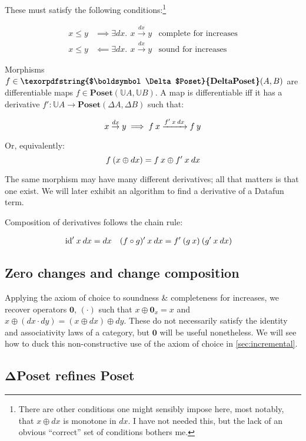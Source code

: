 \documentclass{rntz}\usepackage[a5]{rntzgeometry}\usepackage[fullwidth=130mm,width=330pt,]{narrow}
\newcommand\mathvar[1]{\ensuremath{#1}} %
\newcommand\cat\textbf
\newcommand\CP{\cat{\texorpdfstring{$\boldsymbol\Delta$Poset}{DeltaPoset}}}
\newcommand\Poset{\cat{Poset}}
\newcommand\D\Delta
\newcommand\zero{\ensuremath{\mathbold{0}}}
\newcommand\<{\mskip 4mu plus 4mu minus 1mu}
\newcommand\dx{\mathvar{dx}}
\newcommand\dy{\mathvar{dy}}
\newcommand\fname\text
\newcommand\id{\fname{id}}
\newcommand\valfn{\ensuremath{\mathbb{U}}}
\newcommand\vals{\valfn}
\newcommand\chgs[1]{\D{#1}}
\newcommand\deriv[1]{\ensuremath{#1'}}
\newcommand\upd{\mathbin{\oplus}}
\newcommand\quantifierspace{~\,}
\newcommand\ex[1]{\exists #1.\quantifierspace}
\newcommand\validarrow\to
\newcommand\valid[1]{\mathrel{\overset{#1}{\validarrow}}}
\newcommand\longvalid[1]{\mathrel{\xrightarrow{#1}}}
\newcommand\vld[3]{{#2 \valid{#1} #3}}
\newcommand\longvld[3]{{#2 \longvalid{#1} #3}}
\begin{document}
\noindent
These must satisfy the following conditions:\footnote{There are other conditions
  one might sensibly impose here, most notably, that $x \upd \dx$ is monotone in
  $\dx$. I have not needed this, but the lack of an obvious ``correct'' set of
  conditions bothers me.}

\begin{align*}
  x \le y &\implies \ex{\dx} \vld{\dx} x y
  & \text{complete for increases}\\
  x \le y &\impliedby \ex{\dx} \vld{\dx} x y
  & \text{sound for increases}
\end{align*}

\noindent
Morphisms $f \in \CP(A,B)$ are differentiable maps $f \in \Poset(\vals A, \vals
B)$. A map is differentiable iff it has a derivative $\deriv f : \vals A \to
\Poset(\chgs A, \chgs B)$ such that:

\[ \vld{\dx} x y \implies \longvld{\deriv f\<x\<\dx}{f\<x}{f\<y}\]

\noindent Or, equivalently:
\[ f\<(x \upd \dx) = f\<x \upd \deriv f\<x\<\dx \]

\noindent
The same morphism may have many different derivatives; all that matters is that
one exist. We will later exhibit an algorithm to find a derivative of a Datafun
term.

Composition of derivatives follows the chain rule:

\begin{align*}
  \deriv\id \<x\<\dx &= \dx
  & \deriv{(f \circ g)} \<x\<\dx &= \deriv f \<(g\<x) \<(\deriv g\<x\<\dx)
\end{align*}


\subsection{Zero changes and change composition}

Applying the axiom of choice to soundness \& completeness for increases, we
recover operators $\zero$, $(\cdot)$ such that $x \upd \zero_x = x$ and $x \upd
(\dx \cdot \dy) = (x \upd \dx) \upd \dy$. These do not necessarily satisfy the
identity and associativity laws of a category, but $\zero$ will be useful
nonetheless. We will see how to duck this non-constructive use of the axiom of
choice in \cref{sec:incremental}.


\subsection{\CP{} refines \Poset{}}
\label{sec:refines}
\end{document}
